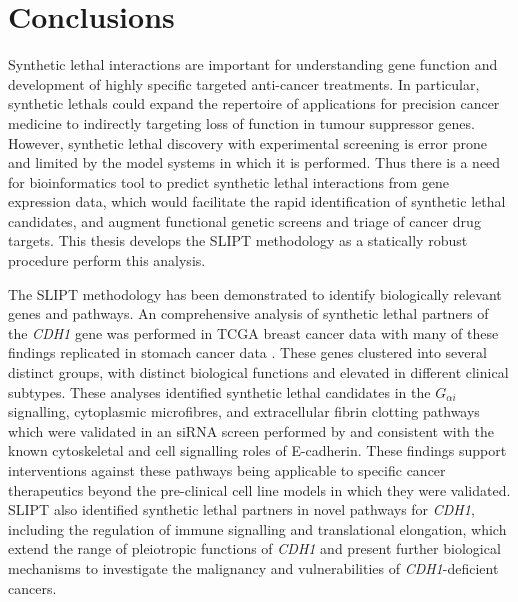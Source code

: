 \clearpage
\section{Conclusions}
\label{chap:conclusion}

Synthetic lethal interactions are important for understanding gene function and development of highly specific targeted anti-cancer \glspl{treatment}. In particular, \glspl{synthetic lethal} could expand the repertoire of applications for precision cancer medicine to indirectly targeting loss of function in \gls{tumour suppressor} genes.  However, \gls{synthetic lethal} discovery with experimental screening is error prone and limited by the model systems in which it is performed. Thus there is a need for \gls{bioinformatics} tool to predict \gls{synthetic lethal} interactions from \gls{gene expression} data, which would facilitate the rapid identification of \gls{synthetic lethal} candidates, and augment functional genetic screens and triage of cancer drug targets. This thesis develops the \acrfull{SLIPT} methodology as a statically robust procedure perform this analysis.

The \gls{SLIPT} methodology has been demonstrated to identify biologically relevant genes and pathways. An comprehensive analysis of \gls{synthetic lethal} partners of the \textit{CDH1} gene was performed in \gls{TCGA} breast cancer data \citep{TCGA2012} with many of these findings replicated in stomach cancer data \citep{TCGA2014GC}. These genes clustered into several distinct groups, with distinct biological functions and elevated  in different clinical subtypes.  These analyses identified \gls{synthetic lethal} candidates in the $G_{\alpha i}$ signalling, cytoplasmic microfibres, and extracellular fibrin clotting pathways which were validated in an \gls{siRNA} screen performed by \citet{Telford2015} and consistent with the known cytoskeletal and cell signalling roles of \gls{E-cadherin}. These findings support interventions against these pathways being applicable to specific cancer therapeutics beyond the pre-clinical cell line models in which they were validated. \gls{SLIPT} also identified \gls{synthetic lethal} partners in novel pathways for \textit{CDH1}, including the regulation of immune signalling and translational elongation, which extend the range of pleiotropic functions of \textit{CDH1} and present further biological mechanisms to investigate the malignancy and vulnerabilities of \textit{CDH1}-deficient cancers.

